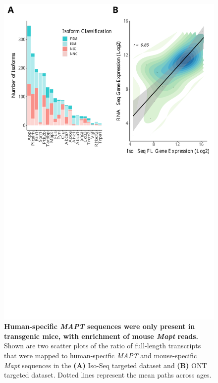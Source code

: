 \begin{figure}[!htp]
	\begin{center}
		\includegraphics[page=12,trim={0 20cm 0 0cm},clip,scale = 0.60]{Figures/ONTvsIsoSeq.pdf}
	\end{center}
	\captionsetup{width=0.95\textwidth}
	\caption[Quantifying human-specific \textit{MAPT} sequences in Iso-Seq targeted dataset]%
	{\textbf{Human-specific \textit{MAPT} sequences were only present in transgenic mice, with enrichment of mouse \textit{Mapt} reads.} Shown are two scatter plots of the ratio of full-length transcripts that were mapped to human-specific \textit{MAPT} and mouse-specific \textit{Mapt} sequences in the \textbf{(A)} Iso-Seq targeted dataset and \textbf{(B)} ONT targeted dataset. Dotted lines represent the mean paths across ages.}
	\label{fig:hmapt_ont_isoseq}
\end{figure}

